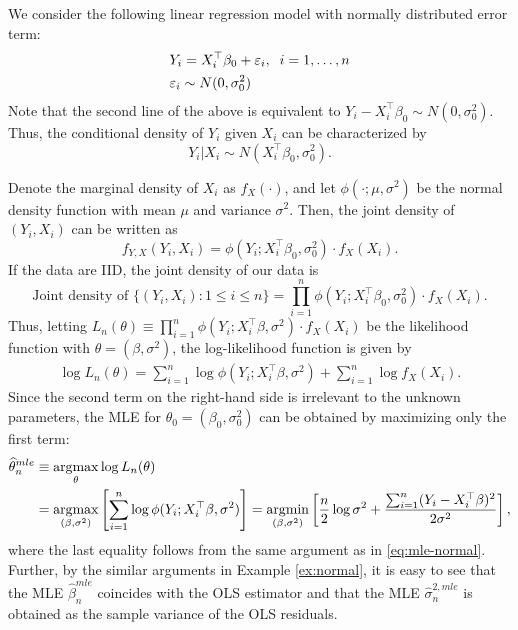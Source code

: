 \documentclass[11pt, A4paper, openany, uplatex]{book}
\begin{document}
\begin{example}\upshape
	We consider the following linear regression model with normally distributed error term:
	\begin{align*}
	& Y_i = X_i^\top \beta_0 + \varepsilon_i, \;\; i = 1, \ldots, n \\
	& \varepsilon_i \sim N(0, \sigma_0^2)
	\end{align*}
	Note that the second line of the above is equivalent to $Y_i - X_i^\top \beta_0 \sim N(0, \sigma_0^2)$.
	Thus, the conditional density of $Y_i$ given $X_i$ can be characterized by
	\[
	Y_i | X_i \sim N(X_i^\top \beta_0, \sigma_0^2).
	\]
	
	Denote the marginal density of $X_i$ as $f_X(\cdot)$, and let $\phi(\cdot ; \mu, \sigma^2)$ be the normal density function with mean $\mu$ and variance $\sigma^2$.
	Then, the joint density of $(Y_i, X_i)$ can be written as
	\[
	f_{Y,X}(Y_i, X_i) = \phi(Y_i ; X_i^\top \beta_0, \sigma_0^2) \cdot f_X(X_i).
	\]
	If the data are IID, the joint density of our data is
	\[
	\text{Joint density of }\{(Y_i, X_i): 1 \le i \le n\} = \prod_{i = 1}^n \phi(Y_i ; X_i^\top \beta_0, \sigma_0^2) \cdot f_X(X_i).
	\]
	Thus, letting $L_n(\theta) \equiv \prod_{i = 1}^n \phi(Y_i ; X_i^\top \beta, \sigma^2) \cdot f_X(X_i)$ be the likelihood function with $\theta = (\beta, \sigma^2)$,  the log-likelihood function is given by
	\begin{align*}
	\log L_n(\theta) = \sum_{i = 1}^n \log \phi(Y_i ; X_i ^\top \beta, \sigma^2) + \sum_{i=1}^n \log f_X(X_i).
	\end{align*}
	Since the second term on the right-hand side is irrelevant to the unknown parameters, the MLE for $\theta_0 = (\beta_0, \sigma_0^2)$ can be obtained by maximizing only the first term:
	\begin{align*}
	\widehat \theta_n^{mle} 
	& \equiv \operatorname*{\arg\!\max}_\theta \log L_n(\theta) \\
	& = \operatorname*{\arg\!\max}_{(\beta, \sigma^2)} \left[ \sum_{i = 1}^n \log \phi(Y_i ; X_i ^\top \beta, \sigma^2)  \right] =  \operatorname*{\arg\!\min}_{(\beta, \sigma^2)} \left[ \frac{n}{2}\log \sigma^2 + \frac{\sum_{i=1}^n (Y_i - X_i ^\top \beta)^2}{2 \sigma^2}\right],
	\end{align*}
	where the last equality follows from the same argument as in \eqref{eq:mle-normal}.
	Further, by the similar arguments in Example \ref{ex:normal}, it is easy to see that the MLE $\hat \beta_n^{mle}$ coincides with the OLS estimator and that the MLE $\hat \sigma_n^{2, mle}$ is obtained as the sample variance of the OLS residuals.
\end{example}
\end{document}
